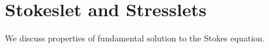\section{Stokeslet and Stresslets}
We discuss properties of fundamental solution to the Stokes equation.
